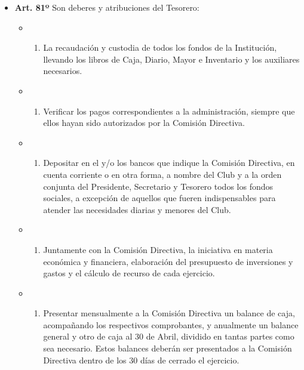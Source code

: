 \documentclass[openany]{book}
\providecommand{\tightlist}{%
  \setlength{\itemsep}{0pt}\setlength{\parskip}{0pt}}
\begin{document}
\begin{itemize}
\tightlist
\item
  \textbf{Art. 81º}
  Son deberes y atribuciones del Tesorero:

  \begin{itemize}
  \item
    \begin{enumerate}
    \def\labelenumi{\alph{enumi})}
    \tightlist
    \item
      La recaudación y custodia de todos los fondos de la Institución, llevando los libros de Caja, Diario, Mayor e Inventario y los auxiliares necesarios.
    \end{enumerate}
  \item
    \begin{enumerate}
    \def\labelenumi{\alph{enumi})}
    \setcounter{enumi}{1}
    \tightlist
    \item
      Verificar los pagos correspondientes a la administración, siempre que ellos hayan sido autorizados por la Comisión Directiva.
    \end{enumerate}
  \item
    \begin{enumerate}
    \def\labelenumi{\alph{enumi})}
    \setcounter{enumi}{2}
    \tightlist
    \item
      Depositar en el y/o los bancos que indique la Comisión Directiva, en cuenta corriente o en otra forma, a nombre del Club y a la orden conjunta del Presidente, Secretario y Tesorero todos los fondos sociales, a excepción de aquellos que fueren indispensables para atender las necesidades diarias y menores del Club.
    \end{enumerate}
  \item
    \begin{enumerate}
    \def\labelenumi{\alph{enumi})}
    \setcounter{enumi}{3}
    \tightlist
    \item
      Juntamente con la Comisión Directiva, la iniciativa en materia económica y financiera, elaboración del presupuesto de inversiones y gastos y el cálculo de recurso de cada ejercicio.
    \end{enumerate}
  \item
    \begin{enumerate}
    \def\labelenumi{\alph{enumi})}
    \setcounter{enumi}{4}
    \tightlist
    \item
      Presentar mensualmente a la Comisión Directiva un balance de caja, acompañando los respectivos comprobantes, y anualmente un balance general y otro de caja al 30 de Abril, dividido en tantas partes como sea necesario. Estos balances deberán ser presentados a la Comisión Directiva dentro de los 30 días de cerrado el ejercicio.

\end{enumerate}
\end{itemize}
\end{itemize}
\end{document}
